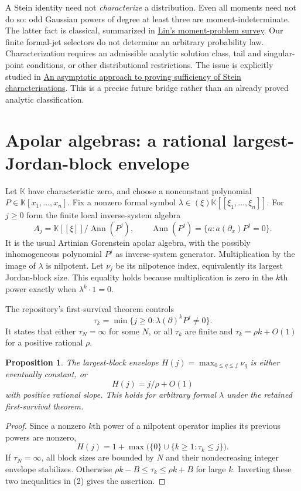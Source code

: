 \documentclass[11pt]{article}
\newtheorem{proposition}{Proposition}
\newcommand{\K}{\mathbb K}
\begin{document}
A Stein identity need not \emph{characterize} a distribution. Even all
moments need not do so: odd Gaussian powers of degree at least three
are moment-indeterminate. The latter fact is classical, summarized in
\href{https://doi.org/10.1186/s40488-017-0059-2}{Lin's moment-problem survey}.
Our finite formal-jet selectors do not determine an arbitrary probability
law. Characterization requires an admissible analytic solution class,
tail and singular-point conditions, or other distributional restrictions.
The issue is explicitly studied in
\href{https://alea.impa.br/articles/v20/20-06.pdf}{An asymptotic approach to
proving sufficiency of Stein characterisations}.
This is a precise future bridge rather than an already proved analytic
classification.

\section{Apolar algebras: a rational largest-Jordan-block envelope}

Let $\K$ have characteristic zero, and choose a nonconstant polynomial
$P\in\K[x_1,\ldots,x_n]$. Fix a nonzero formal symbol
$\lambda\in(\xi)\K[[\xi_1,\ldots,\xi_n]]$.
For $j\ge0$ form the finite local inverse-system algebra
\[
 A_j=\K[[\xi]]/\operatorname{Ann}(P^j),\qquad
 \operatorname{Ann}(P^j)=\{a:a(\partial_x)P^j=0\}.
\]
It is the usual Artinian Gorenstein apolar algebra, with the possibly
inhomogeneous polynomial $P^j$ as inverse-system generator.
Multiplication by the image of $\lambda$ is nilpotent.
Let $\nu_j$ be its nilpotence index, equivalently its largest Jordan-block
size. This equality holds because multiplication is zero in the $k$th
power exactly when $\lambda^k\cdot1=0$.

The repository's first-survival theorem controls
\[
 \tau_k=\min\{j\ge0:\lambda(\partial)^kP^j\ne0\}.
\]
It states that either $\tau_N=\infty$ for some $N$, or all $\tau_k$
are finite and $\tau_k=\rho k+O(1)$ for a positive rational $\rho$.

\begin{proposition}
The largest-block envelope $H(j)=\max_{0\le q\le j}\nu_q$ is either
eventually constant, or
\[
                       H(j)=j/\rho+O(1)
\]
with positive rational slope. This holds for arbitrary formal $\lambda$
under the retained first-survival theorem.
\end{proposition}
\begin{proof}
Since a nonzero $k$th power of a nilpotent operator implies its previous
powers are nonzero,
\[
 H(j)=1+\max\bigl(\{0\}\cup\{k\ge1:\tau_k\le j\}\bigr).        \tag{2}
\]
If $\tau_N=\infty$, all block sizes are bounded by $N$ and their
nondecreasing integer envelope stabilizes. Otherwise
$\rho k-B\le\tau_k\le\rho k+B$ for large $k$.
Inverting these two inequalities in (2) gives the assertion.
\end{proof}
\end{document}
